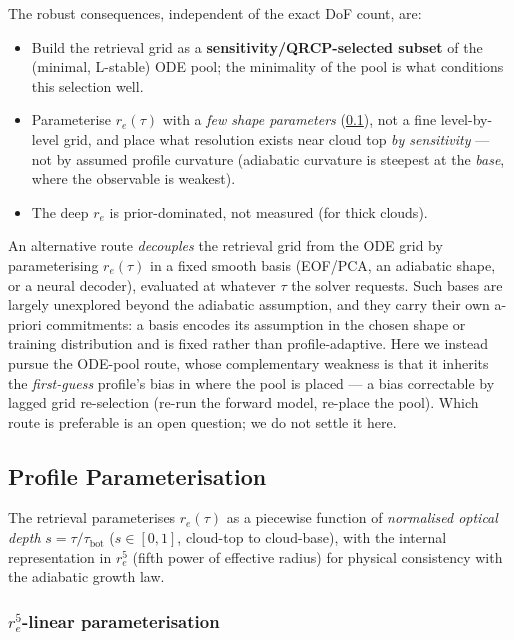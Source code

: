 \documentclass[11pt,a4paper]{article}
\theoremstyle{definition}
\begin{document}
The robust consequences, independent of the exact DoF count, are:
\begin{itemize}[nosep]
  \item Build the retrieval grid as a \textbf{sensitivity/QRCP-selected
    subset} of the (minimal, L-stable) ODE pool; the minimality of the
    pool is what conditions this selection well.
  \item Parameterise $r_e(\tau)$ with a \emph{few shape parameters}
    (\cref{sec:parameterisation}), not a fine level-by-level grid, and
    place what resolution exists near cloud top \emph{by sensitivity} ---
    not by assumed profile curvature (adiabatic curvature is steepest at
    the \emph{base}, where the observable is weakest).
  \item The deep $r_e$ is prior-dominated, not measured (for thick
    clouds).
\end{itemize}

An alternative route \emph{decouples} the retrieval grid from the ODE
grid by parameterising $r_e(\tau)$ in a fixed smooth basis (EOF/PCA, an
adiabatic shape, or a neural decoder), evaluated at whatever $\tau$ the
solver requests.  Such bases are largely unexplored beyond the adiabatic
assumption, and they carry their own a-priori commitments: a basis
encodes its assumption in the chosen shape or training distribution and
is fixed rather than profile-adaptive.  Here we instead pursue the
ODE-pool route, whose complementary weakness is that it inherits the
\emph{first-guess} profile's bias in where the pool is placed --- a bias
correctable by lagged grid re-selection (re-run the forward model,
re-place the pool).  Which route is preferable is an open question; we do
not settle it here.

\subsection{Profile Parameterisation}\label{sec:parameterisation}

The retrieval parameterises $r_e(\tau)$ as a piecewise function of
\emph{normalised optical depth} $s = \tau / \tau_{\mathrm{bot}}$
($s \in [0,1]$, cloud-top to cloud-base), with the internal
representation in $r_e^5$ (fifth power of effective radius) for
physical consistency with the adiabatic growth law.

\subsubsection{$r_e^5$-linear parameterisation}
\end{document}
